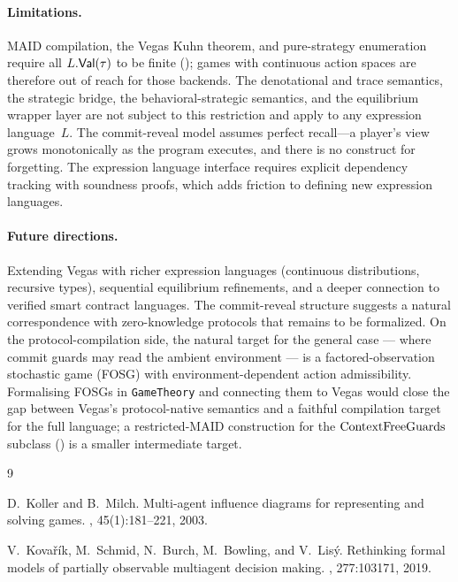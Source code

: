 \documentclass[11pt]{article}
\begin{document}
\paragraph{Limitations.}
MAID compilation, the Vegas Kuhn theorem, and pure-strategy enumeration
require all $L.\mathsf{Val}(\tau)$ to be finite (); games
with continuous action spaces are therefore out of reach for those backends.
The denotational and trace semantics, the strategic bridge, the
behavioral-strategic semantics, and the equilibrium wrapper layer are not
subject to this restriction and apply to any expression language~$L$. The
commit-reveal model assumes perfect recall---a player's view grows
monotonically as the program executes, and there is no construct for
forgetting. The expression language interface requires explicit dependency
tracking with soundness proofs, which adds friction to defining new
expression languages.

\paragraph{Future directions.}
Extending Vegas with richer expression languages (continuous distributions,
recursive types), sequential equilibrium refinements, and a deeper connection
to verified smart contract languages. The commit-reveal structure suggests a
natural correspondence with zero-knowledge protocols that remains to be
formalized. On the protocol-compilation side, the natural target for the
general case --- where commit guards may read the ambient environment ---
is a factored-observation stochastic game (FOSG) with environment-dependent
action admissibility. Formalising FOSGs in \texttt{GameTheory} and
connecting them to Vegas would close the gap between Vegas's
protocol-native semantics and a faithful compilation target for the full
language; a restricted-MAID construction for the $\mathrm{ContextFreeGuards}$
subclass () is a smaller intermediate target.

\begin{thebibliography}{9}

D.~Koller and B.~Milch.
\newblock Multi-agent influence diagrams for representing and solving games.
, 45(1):181--221, 2003.

V.~Kova\v{r}\'ik, M.~Schmid, N.~Burch, M.~Bowling, and V.~Lis\'y.
\newblock Rethinking formal models of partially observable multiagent decision
  making.
, 277:103171, 2019.

\end{thebibliography}
\end{document}
